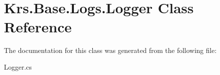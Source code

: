 \hypertarget{class_krs_1_1_base_1_1_logs_1_1_logger}{\section{Krs.\-Base.\-Logs.\-Logger Class Reference}
\label{class_krs_1_1_base_1_1_logs_1_1_logger}
}


The documentation for this class was generated from the following file\-:\begin{DoxyCompactItemize}
\item 
Logger.\-cs\end{DoxyCompactItemize}
